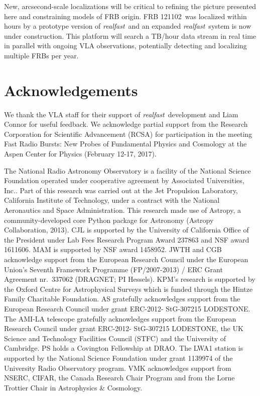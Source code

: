 \documentclass[twocolumn]{aastex61}
\newcommand{\rf}{\emph{realfast}}
\newcommand{\frb}{FRB 121102}
\begin{document}
New, arcsecond-scale localizations will be critical to refining the picture presented here and constraining models of FRB origin. \frb\ was localized within hours by a prototype version of \rf\ and an expanded \rf\ system is now under construction. This platform will search a TB/hour data stream in real time in parallel with ongoing VLA observations, potentially detecting and localizing multiple FRBs per year.



\section*{Acknowledgements}
We thank the VLA staff for their support of \rf\ development and Liam Connor for useful feedback. We acknowledge partial support from the Research Corporation for Scientific Advancement (RCSA) for participation in the meeting Fast Radio Bursts: New Probes of Fundamental Physics and Cosmology at the Aspen Center for Physics (February 12-17, 2017).

The National Radio Astronomy Observatory is a facility of the National Science Foundation operated under cooperative agreement by Associated Universities, Inc..
Part of this research was carried out at the Jet Propulsion Laboratory, California Institute of Technology, under a contract with the National Aeronautics and Space Administration.
This research made use of Astropy, a community-developed core Python package for Astronomy (Astropy Collaboration, 2013).
CJL is supported by the University of California Office of the President under Lab Fees Research Program Award 237863 and NSF award 1611606. MAM is supported by NSF award 1458952. 
JWTH and CGB acknowledge support from the European Research Council under the European Union's Seventh Framework Programme (FP/2007-2013) / ERC Grant Agreement nr.\ 337062 (DRAGNET; PI Hessels).
KPM's research is supported by the Oxford Centre for Astrophysical Surveys which is funded through the Hintze Family Charitable Foundation. AS gratefully acknowledges support from the European Research Council under grant ERC-2012- StG-307215 LODESTONE. The AMI-LA telescope gratefully acknowledges support from the European Research Council under grant ERC-2012- StG-307215 LODESTONE, the UK Science and Technology Facilities Council (STFC) and the University of Cambridge. 
PS holds a Covington Fellowship at DRAO. 
The LWA1 station is supported by the National Science Foundation under grant 1139974 of the University Radio Observatory program.
VMK acknowledges support from NSERC, CIFAR, the Canada Research Chair Program and from the Lorne Trottier Chair in Astrophysics \& Cosmology.




\end{document}
